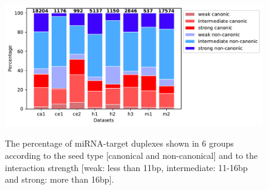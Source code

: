 \documentclass{bmcart}
\begin{document}
\begin{figure}[h!]
  \caption{ The percentage of miRNA-target duplexes shown in 6 groups according to the seed type [canonical and non-canonical] and to the interaction strength [weak: less than 11bp, intermediate: 11-16bp and strong: more than 16bp].}
    \includegraphics[width = 1\textwidth]{Results/seed_type_positive2.pdf}
      \label{fig:seed_type_pos}
      \end{figure}





\end{document}
